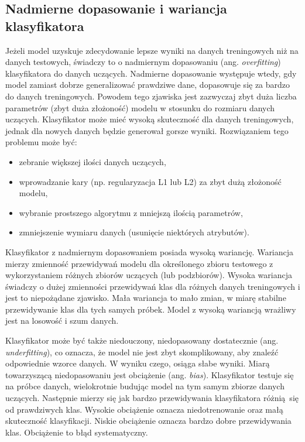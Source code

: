 \subsection{Nadmierne dopasowanie i wariancja klasyfikatora}
Jeżeli model uzyskuje zdecydowanie lepsze wyniki na danych treningowych niż na danych testowych, świadczy to o nadmiernym dopasowaniu (ang. \textit{overfitting}) klasyfikatora do danych uczących. Nadmierne dopasowanie występuje wtedy, gdy model zamiast dobrze generalizować prawdziwe dane, dopasowuje się za bardzo do danych treningowych. Powodem tego zjawiska jest zazwyczaj zbyt duża liczba parametrów (zbyt duża złożoność) modelu w stosunku do rozmiaru danych uczących. Klasyfikator może mieć wysoką skuteczność dla danych treningowych, jednak dla nowych danych będzie generował gorsze wyniki. Rozwiązaniem tego problemu może być:
\begin{itemize}
	\item zebranie większej ilości danych uczących,
	\item wprowadzanie kary (np. regularyzacja L1 lub L2) za zbyt dużą złożoność modelu,
	\item wybranie prostszego algorytmu z mniejszą ilością parametrów,
	\item zmniejszenie wymiaru danych (usunięcie niektórych atrybutów).
\end{itemize}

Klasyfikator z nadmiernym dopasowaniem posiada wysoką wariancję. Wariancja mierzy zmienność przewidywań modelu dla określonego zbioru testowego z wykorzystaniem różnych zbiorów uczących (lub podzbiorów). Wysoka wariancja świadczy o dużej zmienności przewidywań klas dla różnych danych treningowych i jest to niepożądane zjawisko. Mała wariancja to mało zmian, w miarę stabilne przewidywanie klas dla tych samych próbek. Model z wysoką wariancją wrażliwy jest na losowość i szum danych. \par
Klasyfikator może być także niedouczony, niedopasowany dostatecznie (ang. \textit{underfitting}), co oznacza, że model nie jest zbyt skomplikowany, aby znaleźć odpowiednie wzorce danych. W wyniku czego, osiąga słabe wyniki. Miarą towarzyszącą niedopasowaniu jest obciążenie (ang. \textit{bias}). Klasyfikator testuje się na próbce danych, wielokrotnie budując model na tym samym zbiorze danych uczących. Następnie mierzy się jak bardzo przewidywania klasyfikatora różnią się od prawdziwych klas. Wysokie obciążenie oznacza niedotrenowanie oraz małą skuteczność klasyfikacji. Niskie obciążenie oznacza bardzo dobre przewidywania klas. Obciążenie to błąd systematyczny. \par

